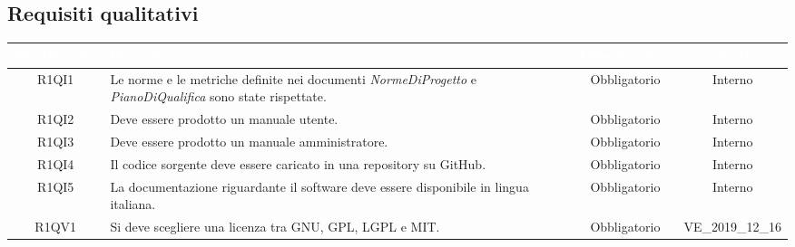 \subsection{Requisiti qualitativi}
{
\renewcommand{\arraystretch}{1.5}
\centering
\begin{longtable}{ c C{8cm} c c}
\textcolor{white}{\textbf{Identificativo}} & \textcolor{white}{\textbf{Descrizione}} & \textcolor{white}{\textbf{Classificazione}} & \textcolor{white}{\textbf{Fonti}}\\	
\endhead

R1QI1 & Le norme e le metriche definite nei documenti \textit{NormeDiProgetto} e \textit{PianoDiQualifica} sono state rispettate. & Obbligatorio & Interno\\

R1QI2 & Deve essere prodotto un manuale utente. & Obbligatorio & Interno\\

R1QI3 & Deve essere prodotto un manuale amministratore. & Obbligatorio & Interno\\

R1QI4 & Il codice sorgente deve essere caricato in una repository su GitHub. & Obbligatorio & Interno\\

R1QI5 & La documentazione riguardante il software deve essere disponibile in lingua italiana. & Obbligatorio & Interno\\

R1QV1 & Si deve scegliere una licenza tra GNU, GPL, LGPL e MIT. & Obbligatorio & VE\_2019\_12\_16 \\

\end{longtable}
}